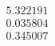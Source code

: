 \documentclass[preview]{standalone}
\begin{document}
\begin{align*}
5.322191 \\ 0.035804 \\ 0.345007
\end{align*}
\end{document}
